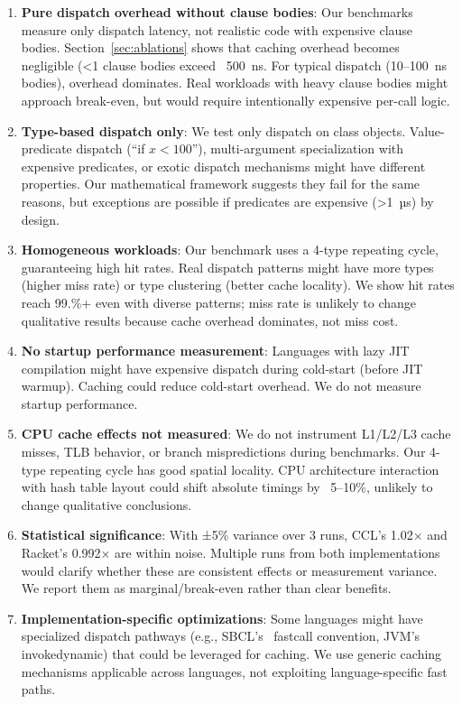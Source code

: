 \documentclass[sigplan,final,acmsmall,review,screen]{acmart}
\begin{document}
\begin{enumerate}
  \item \textbf{Pure dispatch overhead without clause bodies}: Our benchmarks measure only dispatch latency, not realistic code with
    expensive clause bodies. Section~\ref{sec:ablations} shows that caching overhead becomes negligible (<1%
    clause bodies exceed ~500~ns. For typical dispatch (10--100~ns bodies), overhead dominates. Real workloads with heavy
    clause bodies might approach break-even, but would require intentionally expensive per-call logic.

  \item \textbf{Type-based dispatch only}: We test only dispatch on class objects. Value-predicate dispatch
    (``if $x < 100$''), multi-argument specialization with expensive predicates, or exotic dispatch mechanisms
    might have different properties. Our mathematical framework suggests they fail for the same reasons, but exceptions
    are possible if predicates are expensive (>1~µs) by design.

  \item \textbf{Homogeneous workloads}: Our benchmark uses a 4-type repeating cycle, guaranteeing high hit rates.
    Real dispatch patterns might have more types (higher miss rate) or type clustering (better cache locality).
    We show hit rates reach 99.\%+ even with diverse patterns; miss rate is unlikely to change qualitative results
    because cache overhead dominates, not miss cost.

  \item \textbf{No startup performance measurement}: Languages with lazy JIT compilation might have expensive dispatch during cold-start
    (before JIT warmup). Caching could reduce cold-start overhead. We do not measure startup performance.

  \item \textbf{CPU cache effects not measured}: We do not instrument L1/L2/L3 cache misses, TLB behavior, or branch
    mispredictions during benchmarks. Our 4-type repeating cycle has good spatial locality. CPU architecture interaction
    with hash table layout could shift absolute timings by ~5--10\%, unlikely to change qualitative conclusions.

  \item \textbf{Statistical significance}: With ±5\% variance over 3 runs, CCL's 1.02× and Racket's 0.992× are within noise.
    Multiple runs from both implementations would clarify whether these are consistent effects or measurement variance.
    We report them as marginal/break-even rather than clear benefits.

  \item \textbf{Implementation-specific optimizations}: Some languages might have specialized dispatch pathways
    (e.g., SBCL's ~fastcall convention, JVM's invokedynamic) that could be leveraged for caching. We use generic
    caching mechanisms applicable across languages, not exploiting language-specific fast paths.
\end{enumerate}
\end{document}
